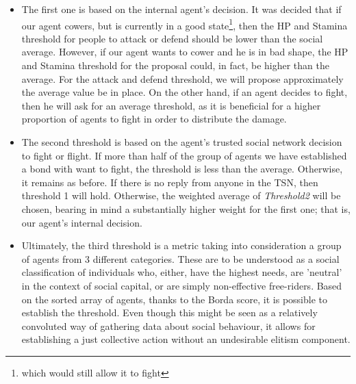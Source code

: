     \begin{itemize}
    \item The first one is based on the internal agent's decision. 
    It was decided that if our agent cowers, but is currently in a good state\footnote{which would still allow it to fight}, then the HP and Stamina threshold for people to attack or defend should be lower than the social average. However, if our agent wants to cower and he is in bad shape, the HP and Stamina threshold for the proposal could, in fact, be higher than the average. For the attack and defend threshold, we will propose approximately the average value be in place.
    On the other hand, if an agent decides to fight, then he will ask for an average threshold, as it is beneficial for a higher proportion of agents to fight in order to distribute the damage.

    \item The second threshold is based on the agent's trusted social network decision to fight or flight. If more than half of the group of agents we have established a bond with want to fight, the threshold is less than the average. Otherwise, it remains as before. If there is no reply from anyone in the TSN, then threshold 1 will hold. Otherwise, the weighted average of \textit{Threshold2} will be chosen, bearing in mind a substantially higher weight for the first one; that is, our agent's internal decision.
    
    \item Ultimately, the third threshold is a metric taking into consideration a group of agents from 3 different categories. These are to be understood as a social classification of individuals who, either, have the highest needs, are 'neutral' in the context of social capital, or are simply non-effective free-riders. 
    Based on the sorted array of agents, thanks to the Borda score, it is possible to establish the threshold. Even though this might be seen as a relatively convoluted way of gathering data about social behaviour, it allows for establishing a just collective action without an undesirable elitism component.
    \end{itemize}

\clearpage



